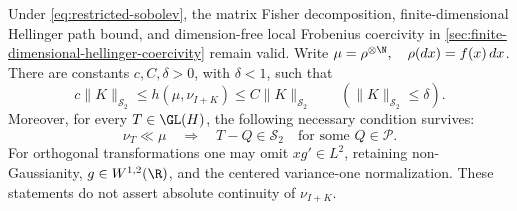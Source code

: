 \begin{proposition}
\label{prop:restricted-local}
Under \eqref{eq:restricted-sobolev}, the matrix Fisher decomposition,
finite-dimensional Hellinger path bound, and dimension-free local
Frobenius coercivity in \cref{sec:finite-dimensional-hellinger-coercivity} remain valid.
Write \(\mu=\rho^{\otimes\N},\quad\rho(dx)=f(x)\,dx\).
There are constants \(c,C,\delta>0\), with \(\delta<1\), such that
\begin{equation}
 c\|K\|_{\mathcal S_2}\leq h(\mu,\nu_{I+K})
       \leq C\|K\|_{\mathcal S_2}
 \qquad(\|K\|_{\mathcal S_2}\leq\delta).
 \label{eq:restricted-hs-local}
\end{equation}
Moreover, for every \(T\in\GL(H)\), the following necessary
condition survives:
\begin{equation}
 \nu_T\ll\mu
 \quad\Longrightarrow\quad
 T-Q\in\mathcal S_2
 \quad\text{for some }Q\in\mathcal P.
 \label{eq:restricted-hs-necessary}
\end{equation}
For orthogonal transformations one may omit \(xg'\in L^2\),
retaining non-Gaussianity, \(g\in W^{1,2}(\R)\), and the centered
variance-one normalization.
These statements do not assert absolute continuity of
\(\nu_{I+K}\).
\end{proposition}
